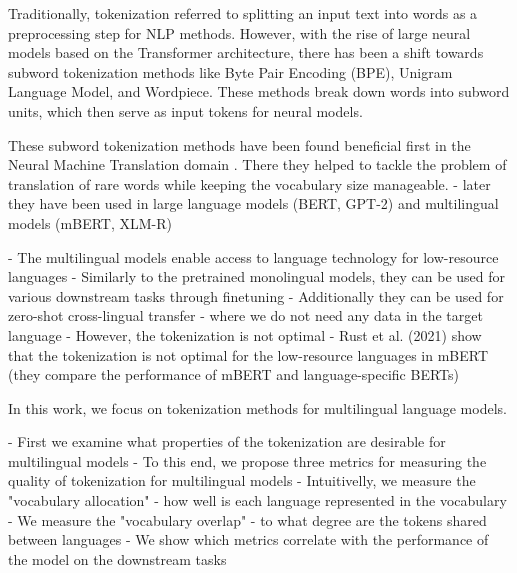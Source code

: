 Traditionally, tokenization referred to splitting an input text into words as a preprocessing step for NLP methods. However, with the rise of large neural models based on the Transformer architecture, there has been a shift towards subword tokenization methods like Byte Pair Encoding (BPE), Unigram Language Model, and Wordpiece. These methods break down words into subword units, which then serve as input tokens for neural models.

These subword tokenization methods have been found beneficial first in the Neural Machine Translation domain \citep{sennrich_neural_2016,kudo_sentencepiece_2018}. There they helped to tackle the problem of translation of rare words while keeping the vocabulary size manageable.
- later they have been used in large language models (BERT, GPT-2) and multilingual models (mBERT, XLM-R)

- The multilingual models enable access to language technology for low-resource languages
- Similarly to the pretrained monolingual models, they can be used for various downstream tasks through finetuning
- Additionally they can be used for zero-shot cross-lingual transfer
    - where we do not need any data in the target language
- However, the tokenization is not optimal
    - Rust et al. (2021) show that the tokenization is not optimal for the low-resource languages in mBERT (they compare the performance of mBERT and language-specific BERTs)

In this work, we focus on tokenization methods for multilingual language models.

- First we examine what properties of the tokenization are desirable for multilingual models
    - To this end, we propose three metrics for measuring the quality of tokenization for multilingual models
        - Intuitivelly, we measure the "vocabulary allocation" - how well is each language represented in the vocabulary
        - We measure the "vocabulary overlap" - to what degree are the tokens shared between languages
    - We show which metrics correlate with the performance of the model on the downstream tasks

